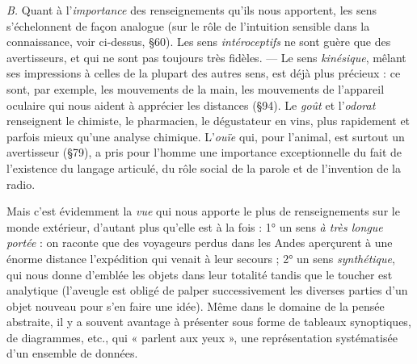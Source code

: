 {\it B.} Quant à l'{\it importance} des renseignements qu’ils nous apportent,
les sens s’échelonnent de façon analogue (sur le rôle de l'intuition
sensible dans la connaissance, voir ci-dessus, \S 60). Les sens {\it intéroceptifs}
ne sont guère que des avertisseurs, et qui ne sont pas toujours
très fidèles. — Le sens {\it kinésique}, mêlant ses impressions à celles de la
plupart des autres sens, est déjà plus précieux : ce sont, par exemple,
les mouvements de la main, les mouvements de l’appareil oculaire
qui nous aident à apprécier les distances (\S 94). Le {\it goût} et l’{\it odorat}
renseignent le chimiste, le pharmacien, le dégustateur en vins, plus
rapidement et parfois mieux qu’une analyse chimique. L’{\it ouïe} qui,
pour l’animal, est surtout un avertisseur (\S 79), a pris pour l’homme
une importance exceptionnelle du fait de l’existence du langage articulé,
du rôle social de la parole et de l’invention de la radio.

Mais c’est évidemment la {\it vue} qui nous apporte le plus de renseignements
sur le monde extérieur, d'autant plus qu’elle est à la fois :
1° un sens {\it à très longue portée} : on raconte que des voyageurs perdus
dans les Andes aperçurent à une énorme distance l'expédition qui
venait à leur secours ; 2° un sens {\it synthétique}, qui nous donne d’emblée
les objets dans leur totalité tandis que le toucher est analytique
(l’aveugle est obligé de palper successivement les diverses parties
d’un objet nouveau pour s’en faire une idée). Même dans le domaine
de la pensée abstraite, il y a souvent avantage à présenter sous forme
de tableaux synoptiques, de diagrammes, etc., qui « parlent aux yeux »,
une représentation systématisée d’un ensemble de données.

